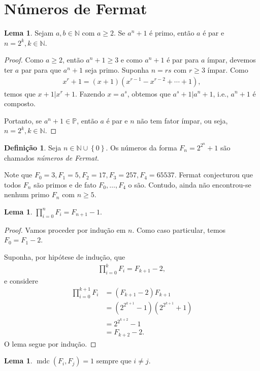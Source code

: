 \documentclass[a4paper,11pt,twoside, leqno]{article}
\DeclareMathOperator{\mdc}{mdc}
\theoremstyle{definition}
\newtheorem*{definition}{Definição}
\newtheorem{lemma}[theorem]{Lema}
\begin{document}
\section{Números de Fermat}
\begin{lemma}
	\label{lema 22}
	Sejam $a,b\in\mathbb{N}$ com $a\geq 2$. Se $a^n + 1$ é primo, então $a$ é par e $n = 2^k, k\in\mathbb{N}$.
\end{lemma}
\begin{proof}
	Como $a\geq 2$, então $a^n + 1\geq 3$ e como $a^n + 1$ é par para $a$ ímpar, devemos ter $a$ par para que $a^n + 1$ seja primo. Suponha $n = rs$ com $r\geq 3$ ímpar. Como
	\begin{align*}
	x^r + 1 = (x+1)(x^{r-1} - x^{r-2} + \cdots + 1),
	\end{align*}
	temos que $x+1|x^r+1$. Fazendo $x = a^s$, obtemos que $a^s+1|a^n+1$, i.e., $a^n + 1$ é composto.
	
	Portanto, se $a^n+1\in\mathbb{P}$, então $a$ é par e $n$ não tem fator ímpar, ou seja, $n = 2^k,k\in\mathbb{N}$. 
\end{proof}
\begin{definition}
	Seja $n\in\mathbb{N}\cup\left\{0\right\}$. Os números da forma $F_n = 2^{2^n} + 1$ são chamados {\em números de Fermat}.
\end{definition}
Note que $F_0 = 3, F_1 = 5, F_2 = 17, F_3 = 257, F_4 = 65537$. Fermat conjecturou que todos $F_n$ são primos e de fato $F_0, \dots, F_4$ o são. Contudo, ainda não encontrou-se nenhum primo $F_n$ com $n\geq 5$.
\begin{lemma}
	\label{lema 23}
	$\displaystyle{ \prod_{i=0}^{n}F_i  = F_{n+1} - 1}$.
\end{lemma}
\begin{proof}
	Vamos proceder por indução em $n$. Como caso particular, temos $F_0 = F_1 - 2$. 
	
	Suponha, por hipótese de indução, que
	\begin{align*}
	\prod_{i=0}^{k} F_i = F_{k+1} - 2,
	\end{align*}
	e considere
	\begin{align*}
	\prod_{i=0}^{k+1} F_i &= (F_{k+1} - 2)F_{k+1} \\
	&= \left( 2^{2^{k+1}} - 1 \right)\left( 2^{2^{k+1}}  + 1\right) \\
	&= 2^{2^{k+2}} - 1 \\
	&= F_{k+2} - 2.
	\end{align*}
	O lema segue por indução.
\end{proof}
\begin{lemma}
	\label{lema 24}
	$\mdc(F_i, F_j) = 1$ sempre que $i\neq j$. 
\end{lemma}
\end{document}
